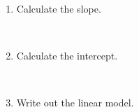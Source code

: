 \documentclass[11pt]{article}
\newcommand{\soln}[2]{$\:$\\ \vspace{#1}}{}
\begin{document}
\begin{enumerate}

\item Calculate the slope.

\soln{1cm}{$b_1 = R \times \frac{s_y}{s_x} = 0.84 * \frac{9.88}{3.24} = 2.56$}

\item Calculate the intercept.

\soln{1cm}{$b_0 = \bar{y} - b_1 \times \bar{x} = 20.57 - 2.56 * 19.72 = -29.91$}

\item Write out the linear model.

\soln{1cm}{$\widehat{murder} = -29.91 + 2.56~poverty$}

\end{enumerate}
\end{document}

